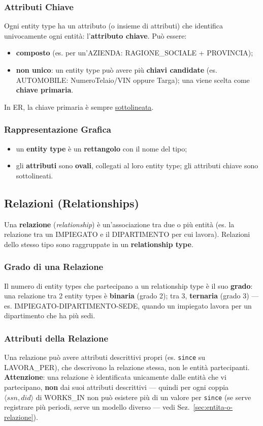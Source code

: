 \documentclass[12pt, a4paper]{article}
\begin{document}
\subsubsection{Attributi Chiave}
Ogni entity type ha un attributo (o insieme di attributi) che identifica univocamente ogni entità: l'\textbf{attributo chiave}. Può essere:
\begin{itemize}
    \item \textbf{composto} (es. per un'AZIENDA: RAGIONE\_SOCIALE + PROVINCIA);
    \item \textbf{non unico}: un entity type può avere più \textbf{chiavi candidate} (es. AUTOMOBILE: NumeroTelaio/VIN oppure Targa); una viene scelta come \textbf{chiave primaria}.
\end{itemize}
In ER, la chiave primaria è sempre \underline{sottolineata}.

\subsubsection{Rappresentazione Grafica}
\begin{itemize}
    \item un \textbf{entity type} è un \textbf{rettangolo} con il nome del tipo;
    \item gli \textbf{attributi} sono \textbf{ovali}, collegati al loro entity type; gli attributi chiave sono sottolineati.
\end{itemize}

\subsection{Relazioni (Relationships)}

Una \textbf{relazione} (\textit{relationship}) è un'associazione tra due o più entità (es. la relazione tra un IMPIEGATO e il DIPARTIMENTO per cui lavora). Relazioni dello stesso tipo sono raggruppate in un \textbf{relationship type}.

\subsubsection{Grado di una Relazione}
Il numero di entity types che partecipano a un relationship type è il suo \textbf{grado}: una relazione tra 2 entity types è \textbf{binaria} (grado 2); tra 3, \textbf{ternaria} (grado 3) — es. IMPIEGATO-DIPARTIMENTO-SEDE, quando un impiegato lavora per un dipartimento che ha più sedi.

\subsubsection{Attributi della Relazione}
Una relazione può avere attributi descrittivi propri (es. \texttt{since} su LAVORA\_PER), che descrivono la relazione stessa, non le entità partecipanti. \textbf{Attenzione}: una relazione è identificata unicamente dalle entità che vi partecipano, \textbf{non} dai suoi attributi descrittivi — quindi per ogni coppia $\langle ssn,did\rangle$ di WORKS\_IN non può esistere più di un valore per \texttt{since} (se serve registrare più periodi, serve un modello diverso — vedi Sez.~\ref{sec:entita-o-relazione}).
\end{document}
